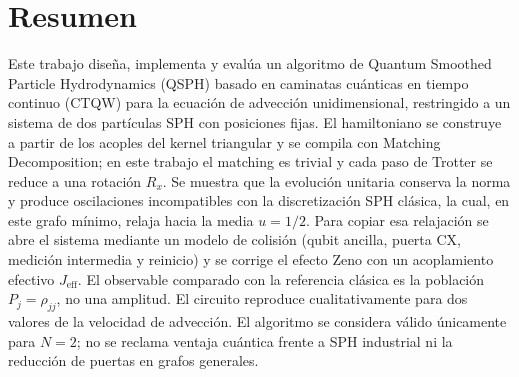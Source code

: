 \documentclass[a4paper,12pt,openany,twoside,spanish]{book}
\makeatletter
\renewcommand\frontmatter{\clearpage\@mainmatterfalse\pagenumbering{roman}}
\newcommand{\hojablanca}{%
  \clearpage
  \thispagestyle{empty}%
  \mbox{}%
  \clearpage
}
\makeatother
\begin{document}
\pagestyle{empty}


\frontmatter
\pagestyle{fancy}

\hojablanca



\hojablanca

\chapter*{Resumen}
Este trabajo diseña, implementa y evalúa un algoritmo de Quantum Smoothed Particle Hydrodynamics (QSPH) basado en caminatas cuánticas en tiempo continuo (CTQW) para la ecuación de advección unidimensional, restringido a un sistema de dos partículas SPH con posiciones fijas. El hamiltoniano se construye a partir de los acoples del kernel triangular y se compila con Matching Decomposition; en este trabajo el matching es trivial y cada paso de Trotter se reduce a una rotación $R_x$. Se muestra que la evolución unitaria conserva la norma y produce oscilaciones incompatibles con la discretización SPH clásica, la cual, en este grafo mínimo, relaja hacia la media $u=1/2$. Para copiar esa relajación se abre el sistema mediante un modelo de colisión (qubit ancilla, puerta CX, medición intermedia y reinicio) y se corrige el efecto Zeno con un acoplamiento efectivo $J_{\mathrm{eff}}$. El observable comparado con la referencia clásica es la población $P_j=\rho_{jj}$, no una amplitud. El circuito reproduce cualitativamente para dos valores de la velocidad de advección. El algoritmo se considera válido únicamente para $N=2$; no se reclama ventaja cuántica frente a SPH industrial ni la reducción de puertas en grafos generales.

\end{document}
